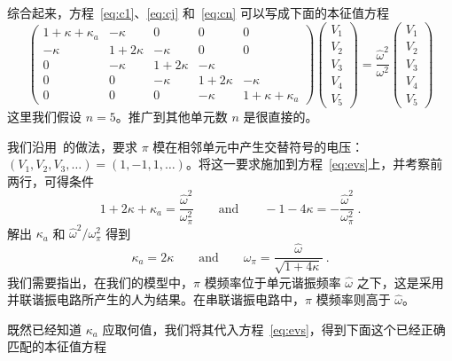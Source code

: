 \documentclass[12pt]{article}
\newcommand\ho{\hat\omega}
\newcommand\opi{\omega_{\pi}}
\begin{document}
综合起来，方程~\ref{eq:c1}、\ref{eq:cj} 和~\ref{eq:cn} 可以写成下面的本征值方程
\begin{equation}\label{eq:evs}
  \left(
    \begin{array}{ccccc}
      1+\kappa+\kappa_a & -\kappa & 0 & 0 & 0 \\
      -\kappa & 1+ 2\kappa & -\kappa & 0 & 0 \\
      0  &-\kappa & 1+ 2\kappa & -\kappa &  \\
      0 &0  &-\kappa & 1+ 2\kappa & -\kappa \\
      0  & 0  & 0  & -\kappa & 1+\kappa+\kappa_a
    \end{array}
  \right)
  \left(\begin{array}{c} V_1\\ V_2\\ V_3\\ V_4\\ V_5\end{array}\right)
  = \frac{\ho^2}{\omega^2}
  \left(\begin{array}{c} V_1\\ V_2\\ V_3\\ V_4\\ V_5\end{array}\right)
\end{equation}
这里我们假设 $n=5$。推广到其他单元数 $n$ 是很直接的。
\par
我们沿用~\cite{PKH}的做法，要求 $\pi$ 模在相邻单元中产生交替符号的电压：$(V_1,V_2,V_3,\dots)=(1,-1,1,\dots)$。将这一要求施加到方程~\ref{eq:evs}上，并考察前两行，可得条件
\begin{equation}
  1+2\kappa+\kappa_a  = \frac{\ho^2}{\opi^2}
  \qquad\mathrm{and}\qquad
  -1-4\kappa = -\frac{\ho^2}{\opi^2}\ .
\end{equation}
解出 $\kappa_a$ 和 $\ho^2/\opi^2$ 得到
\begin{equation}\label{eq:sol}
  \kappa_a=2\kappa
  \qquad\mathrm{and}\qquad
  \opi = \frac{\ho}{\sqrt{1+4\kappa}}\ .
\end{equation}
我们需要指出，在我们的模型中，$\pi$ 模频率位于单元谐振频率 $\ho$ 之下，这是采用并联谐振电路所产生的人为结果。在串联谐振电路中，$\pi$ 模频率则高于 $\ho$。
\par
既然已经知道 $\kappa_a$ 应取何值，我们将其代入方程~\ref{eq:evs}，得到下面这个已经正确匹配的本征值方程
\end{document}
